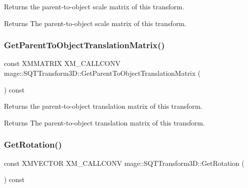 Returns the parent-\/to-\/object scale matrix of this transform.

\begin{DoxyReturn}{Returns}
The parent-\/to-\/object scale matrix of this transform. 
\end{DoxyReturn}
\mbox{\label{classmage_1_1_s_q_t_transform3_d_a9d958614bde658f12c2af6e5bb89e44f}} 
\subsubsection{\texorpdfstring{Get\+Parent\+To\+Object\+Translation\+Matrix()}{GetParentToObjectTranslationMatrix()}}
{\footnotesize\ttfamily const X\+M\+M\+A\+T\+R\+IX X\+M\+\_\+\+C\+A\+L\+L\+C\+O\+NV mage\+::\+S\+Q\+T\+Transform3\+D\+::\+Get\+Parent\+To\+Object\+Translation\+Matrix (\begin{DoxyParamCaption}{ }\end{DoxyParamCaption}) const\hspace{0.3cm}{\ttfamily [noexcept]}}

Returns the parent-\/to-\/object translation matrix of this transform.

\begin{DoxyReturn}{Returns}
The parent-\/to-\/object translation matrix of this transform. 
\end{DoxyReturn}
\mbox{\label{classmage_1_1_s_q_t_transform3_d_a3acafbb5ecfcf107b727d88f59442df0}} 
\subsubsection{\texorpdfstring{Get\+Rotation()}{GetRotation()}}
{\footnotesize\ttfamily const X\+M\+V\+E\+C\+T\+OR X\+M\+\_\+\+C\+A\+L\+L\+C\+O\+NV mage\+::\+S\+Q\+T\+Transform3\+D\+::\+Get\+Rotation (\begin{DoxyParamCaption}{ }\end{DoxyParamCaption}) const\hspace{0.3cm}{\ttfamily [noexcept]}}

